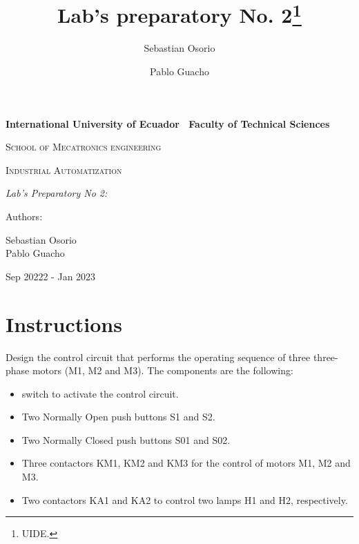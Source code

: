 \documentclass[runningheads]{llncs}
\begin{document}
\begin{titlepage}
    \centering
    {\bfseries\LARGE International University of Ecuador \
        Faculty of Technical Sciences  \par}
    \vspace{1cm}
    {\scshape\Large School of Mecatronics engineering \par}
    \vspace{3cm}
    {\scshape\Huge Industrial Automatization \par}
    \vspace{3cm}
    {\itshape\Large Lab's Preparatory No 2:  \par}
    \vfill
    {\Large Authors: \par}
    {\Large Sebastian Osorio \\ Pablo Guacho \par}
    \vfill
    {\Large Sep 20222 - Jan 2023 \par}
\end{titlepage}
\newpage
\title{Lab's preparatory No. 2\thanks{UIDE.}}
%
\author{Sebastian Osorio \and Pablo Guacho}



\maketitle



\section{Instructions}
Design the control circuit that performs the operating sequence of three three-phase motors (M1, M2 and M3).
The components are the following:
\begin{itemize}
    \item  switch to activate the control circuit.
    \item Two Normally Open push buttons S1 and S2.
    \item  Two Normally Closed push buttons S01 and S02.
    \item  Three contactors KM1, KM2 and KM3 for the control of motors M1, M2 and
          M3.
    \item Two contactors KA1 and KA2 to control two lamps H1 and H2, respectively.
\end{itemize}
\end{document}
